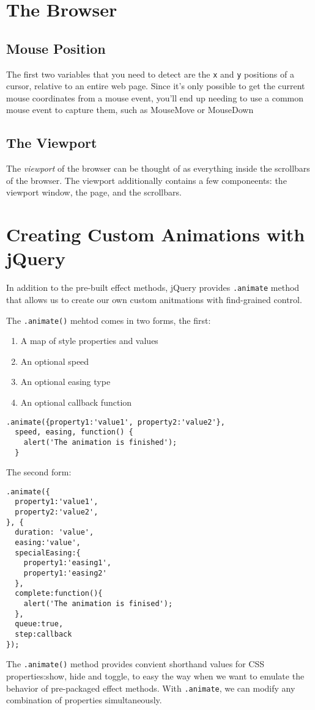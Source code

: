 \documentclass[a4paper,11pt]{book}
\begin{document}
\section{The Browser}
\subsection{Mouse Position}
The first two variables that you need to detect are the \verb|x| and \verb|y|
positions of a cursor, relative to an entire web page. Since it's only possible
to get the current mouse coordinates from a mouse event, you'll end up needing
to use a common mouse event to capture them, such as MouseMove or MouseDown
\subsection{The Viewport}
The \emph{viewport} of the browser can be thought of as everything inside the
scrollbars of the browser.  The viewport additionally contains a few
componeents: the viewport window, the page, and the scrollbars. 
\section{Creating Custom Animations with jQuery}
In addition to the pre-built effect methods, jQuery provides \verb|.animate|
method that allows us to create our own custom anitmations with find-grained
control.

The \verb|.animate()| mehtod comes in two forms, the first:
\begin{enumerate}
\item A map of style properties and values
\item An optional speed
\item An optional easing type
\item An optional callback function
\end{enumerate}
\begin{verbatim}
.animate({property1:'value1', property2:'value2'},
  speed, easing, function() {
    alert('The animation is finished');
  }
\end{verbatim}

The second form:
\begin{verbatim}
.animate({
  property1:'value1',
  property2:'value2',
}, {
  duration: 'value',
  easing:'value', 
  specialEasing:{
    property1:'easing1',
    property1:'easing2'
  },
  complete:function(){
    alert('The animation is finised');
  },
  queue:true,
  step:callback
});
\end{verbatim}
The \verb|.animate()| method provides convient shorthand values for CSS
properties:show, hide and toggle, to easy the way when we want to emulate the
behavior of pre-packaged effect methods. With \verb|.animate|, we can modify any
combination of properties simultaneously.
\end{document}
